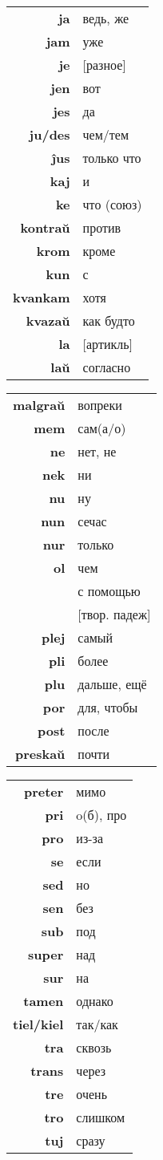 \documentclass{article}
\begin{document}
\hspace{-3em}
\begin{tabular}{>{\bfseries}rl}
\hline
ja & ведь, же \\
jam & уже \\
je & {}[разное] \\
jen & вот \\
jes & да \\
ju/des & чем/тем \\
ĵus & только что \\
kaj & и \\
ke & что (союз) \\
kontraŭ & против \\
krom & кроме \\
kun & с \\
kvankam & хотя \\
kvazaŭ & как будто \\
la & {}[артикль] \\
laŭ & согласно \\
\hline
\end{tabular}
\hspace{-1em}
\begin{tabular}{>{\bfseries}rl}
\hline
malgraŭ & вопреки \\
mem & сам(а/о) \\
ne & нет, не \\
nek & ни \\
nu & ну \\
nun & сечас \\
nur & только \\
ol & чем \\
\multirow{2}{*}{per} & с помощью \\
& {}[твор. падеж] \\
plej & самый \\
pli & более \\
plu & дальше, ещё \\
por & для, чтобы \\
post & после \\
preskaŭ & почти \\
\hline
\end{tabular}
\hspace{-1em}
\begin{tabular}{>{\bfseries}rl|}
\hline
preter & мимо \\
pri & o(б), про \\
pro & из-за \\
se & если \\
sed & но \\
sen & без \\
sub & под \\
super & над \\
sur & на \\
tamen & однако \\
tiel/kiel & так/как \\
tra & сквозь \\
trans & через \\
tre & очень \\
tro & слишком \\
tuj & сразу \\
\hline
\end{tabular}
\end{document}
